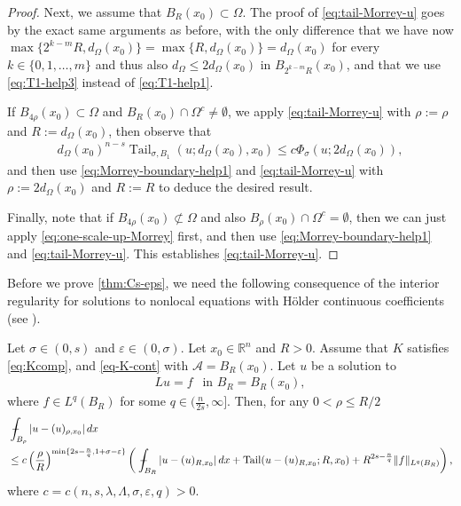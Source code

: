 \documentclass[11pt,reqno]{amsart}
\theoremstyle{plain}
\theoremstyle{definition}
\numberwithin{equation}{section}
\newcommand{\R}{\mathbb{R}}
\newcommand{\eps}{\varepsilon}
\newcommand{\1}{\mathbbm{1}}
\DeclareMathOperator{\tail}{Tail}
\renewcommand{\d}{\textnormal{\,d}}
\newcommand{\average}{{\mathchoice {\kern1ex\vcenter{\hrule height.4pt
width 6pt depth0pt} \kern-9.7pt} {\kern1ex\vcenter{\hrule
height.4pt width 4.3pt depth0pt} \kern-7pt} {} {} }}
\newcommand{\dashint}{\average\int}
\begin{document}
\begin{proof}
Next, we assume that $B_R(x_0) \subset \Omega$. The proof of \eqref{eq:tail-Morrey-u} goes by the exact same arguments as before, with the only difference that we have now $\max\{2^{k-m}R, d_{\Omega}(x_0)\} = \max\{R, d_{\Omega}(x_0)\} = d_{\Omega}(x_0)$ for every $k \in \{0, 1, \dots, m\}$ and thus also $d_{\Omega} \le 2 d_{\Omega}(x_0)$ in $B_{2^{k-m}R}(x_0)$, and that we use \eqref{eq:T1-help3} instead of \eqref{eq:T1-help1}.

If $B_{4\rho}(x_0) \subset \Omega$ and $B_R(x_0) \cap \Omega^c \not=\emptyset$, we apply \eqref{eq:tail-Morrey-u} with $\rho := \rho$ and $R := d_{\Omega}(x_0)$, then observe that
\begin{align*}
d_{\Omega}(x_0)^{n-s}\tail_{\sigma,B_1}(u ; d_{\Omega}(x_0), x_0) \leq c\Phi_{\sigma}(u; 2d_\Omega(x_0)),
\end{align*}
and then use \eqref{eq:Morrey-boundary-help1} and \eqref{eq:tail-Morrey-u} with $\rho := 2 d_{\Omega}(x_0)$ and $R := R$ to deduce the desired result.

Finally, note that if $B_{4\rho}(x_0) \not\subset \Omega$ and also $B_{\rho}(x_0) \cap \Omega^c = \emptyset$, then we can just apply \eqref{eq:one-scale-up-Morrey} first, and then use  \eqref{eq:Morrey-boundary-help1} and \eqref{eq:tail-Morrey-u}.
This establishes \eqref{eq:tail-Morrey-u}.
\end{proof}


Before we prove \autoref{thm:Cs-eps}, we need the following consequence of the interior regularity for solutions to nonlocal equations with H\"older continuous coefficients (see \cite{FeRo24b}).

\begin{lemma}
\label{lemma:interior-excess-decay}
Let $\sigma \in (0,s)$ and $\eps \in (0,\sigma)$. Let $x_0 \in \R^n$ and $R > 0$. Assume that $K$ satisfies \eqref{eq:Kcomp}, and \eqref{eq-K-cont} with $\mathcal{A} = B_R(x_0)$.
Let $u$ be a solution to
\begin{align*}
Lu = f ~~ \text{ in } B_R=B_R(x_0),
\end{align*}
where $f \in L^q(B_R)$ for some $q \in (\frac{n}{2s},\infty]$. Then, for any $0 < \rho \le R/2$
\begin{align*}
&\dashint_{B_{\rho}} |u - (u)_{\rho,x_0}| \d x \\
&\leq c \left( \frac{\rho}{R} \right)^{\min \{2s - \frac{n}{q} , 1+\sigma-\eps \} } \left( \dashint_{B_{R}} |u - (u)_{R,x_0}| \d x + \tail(u - (u)_{R,x_0}; R,x_0) + R^{2s - \frac{n}{q}} \Vert f \Vert_{L^q(B_{R})} \right),
\end{align*}
where $c=c(n,s,\lambda,\Lambda,\sigma,\eps,q)>0$.
\end{lemma}
\end{document}
